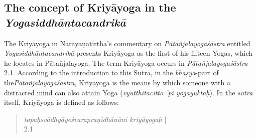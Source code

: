 %
%
%
%
%
\subsection{The concept of Kriyāyoga in the \textit{Yogasiddhāntacandrikā}}

The Kriyāyoga in Nārāyaṇatīrtha's commentary on \textit{Pātañjalayogaśāstra} entitled \textit{Yogasiddhāntacandrikā} presents Kriyāyoga as the first of his fifteen Yogas, which he locates in Pātañjalayoga. The term Kriyāyoga occurs in \textit{Pātañjalayogaśāstra} 2.1. According to the introduction to this Sūtra, in the \textit{bhāṣya}-part of the\textit{Pātañjalayogaśāstra}, Kriyāyoga is the means by which someone with a distracted mind can also attain Yoga (\textit{vyutthitacitto 'pi yogayuktaḥ}). In the \textit{sūtra} itself, Kriyāyoga is defined as follows:
\begin{quote}  
  \textit{tapaḥsvādhyāyeśvarapraṇidhānāni kriyāyogaḥ} |\\
   2.1  \\
\end{quote}

